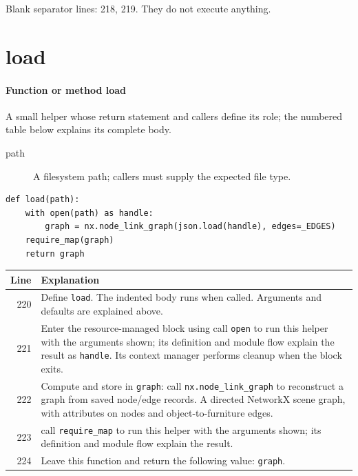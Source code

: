 \documentclass[11pt,a4paper]{book}
\begin{document}
Blank separator lines: 218, 219. They do not execute anything.

\section{load}

\paragraph{Function or method load}
A small helper whose return statement and callers define its role; the numbered table below explains its complete body.

\begin{description}
\item[path] A filesystem path; callers must supply the expected file type.
\end{description}

\begin{lstlisting}[firstnumber=220]
def load(path):
    with open(path) as handle:
        graph = nx.node_link_graph(json.load(handle), edges=_EDGES)
    require_map(graph)
    return graph
\end{lstlisting}

\begin{longtable}{r p{}}

\textbf{Line} & \textbf{Explanation} \\ \hline \endhead

220 & Define \texttt{load}. The indented body runs when called. Arguments and defaults are explained above. \\

221 & Enter the resource-managed block using call \texttt{open} to run this helper with the arguments shown; its definition and module flow explain the result as \texttt{handle}. Its context manager performs cleanup when the block exits. \\

222 & Compute and store in \texttt{graph}: call \texttt{nx.node\_link\_graph} to reconstruct a graph from saved node/edge records. A directed NetworkX scene graph, with attributes on nodes and object-to-furniture edges. \\

223 & call \texttt{require\_map} to run this helper with the arguments shown; its definition and module flow explain the result. \\

224 & Leave this function and return the following value: \texttt{graph}. \\

\end{longtable}
\end{document}
